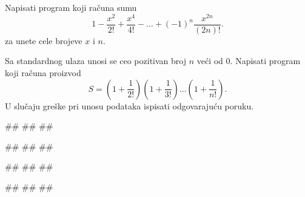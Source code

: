 \begin{Exercise}[difficulty=1, label=p1.7_] 
Napisati program koji računa sumu
$$1 - \frac{x^{2}}{2!} + \frac{x^{4}}{4!} - \ldots +
(-1)^{n}\frac{x^{2n}}{(2n)!}.$$ za unete cele brojeve $x$ i $n$. 
\end{Exercise}
\begin{Answer}[ref=p1.7_]
\end{Answer}


\begin{Exercise}[difficulty=1, label=p1.7_] 
Sa standardnog ulaza unosi se ceo pozitivan broj $n$ veći od $0$. 
Napisati program koji računa proizvod
$$S = (1 + \frac{1}{2!})(1 + \frac{1}{3!})\ldots(1 +
\frac{1}{n!}).$$ U slučaju greške pri unosu podataka ispisati 
odgovarajuću  poruku.  
  
\begin{miditest}
\begin{upotreba}{1}
#\naslovInt#
##
##
\end{upotreba}
\end{miditest}
\begin{miditest}
\begin{upotreba}{2}
#\naslovInt#
##
##
\end{upotreba}
\end{miditest}

\begin{miditest}
\begin{upotreba}{3}
#\naslovInt#
##
##
\end{upotreba}
\end{miditest}
\begin{miditest}
\begin{upotreba}{4}
#\naslovInt#
##
##
\end{upotreba}
\end{miditest}
\end{Exercise}
\begin{Answer}[ref=p1.7_]
\end{Answer}

